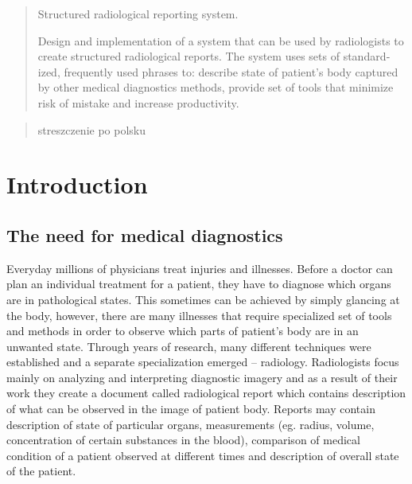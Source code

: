 \documentclass[12pt, twoside, openany]{report}
\theoremstyle{definition}
\begin{document}
\thispagestyle{empty}
\newpage
\pagestyle{headings}
\setcounter{page}{1}
\begin{otherlanguage}{british}
\begin{abstract}
Structured radiological reporting system.

Design and implementation of a system that can be used by radiologists to create structured radiological reports. The system uses sets of standardized, frequently used phrases to: describe state of patient's body captured by other medical diagnostics methods, provide set of tools that minimize risk of mistake and increase productivity. 
\end{abstract}
\end{otherlanguage}

\begin{otherlanguage}{polish}
\begin{abstract}
streszczenie po polsku
\end{abstract}
\end{otherlanguage}

\tableofcontents
\clearpage

\chapter{Introduction}
\section{The need for medical diagnostics}
Everyday millions of physicians treat injuries and illnesses. Before a doctor can plan an individual treatment for a patient, they have to diagnose which organs are in pathological states\cite{bls}. This sometimes can be achieved by simply glancing at the body, however, there are many illnesses that require specialized set of tools and methods in order to observe which parts of patient's body are in an unwanted state. Through years of research, many different techniques were established and a separate specialization emerged -- radiology. Radiologists focus mainly on analyzing and interpreting diagnostic imagery and as a result of their work they create a document called radiological report which contains description of what can be observed in the image of patient body. Reports may contain description of state of particular organs, measurements (eg. radius, volume, concentration of certain substances in the blood), comparison of medical condition of a patient observed at different times and description of overall state of the patient. \\
\end{document}

